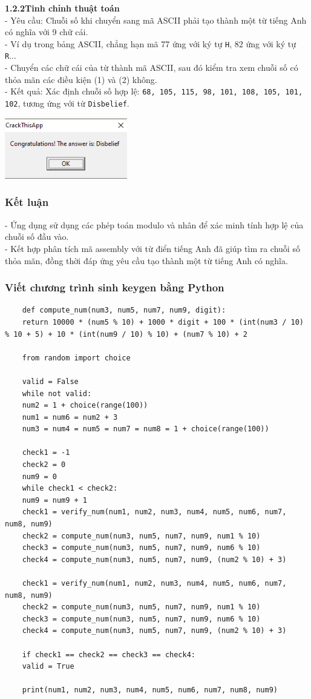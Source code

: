 \noindent\textbf{1.2.2\quad Tinh chỉnh thuật toán}\\
- Yêu cầu: Chuỗi số khi chuyển sang mã ASCII phải tạo thành một từ tiếng Anh có nghĩa với 9 chữ cái.\\
- Ví dụ trong bảng ASCII, chẳng hạn mã 77 ứng với ký tự \texttt{H}, 82 ứng với ký tự \texttt{R}...\\
- Chuyển các chữ cái của từ thành mã ASCII, sau đó kiểm tra xem chuỗi số có thỏa mãn các điều kiện (1) và (2) không.\\
- Kết quả: Xác định chuỗi số hợp lệ: \texttt{68, 105, 115, 98, 101, 108, 105, 101, 102}, tương ứng với từ \texttt{Disbelief}.
\begin{center}
	\includegraphics[width=0.4\textwidth]{img/file-1/image9.png}
\end{center}

\subsubsection{Kết luận}
- Ứng dụng sử dụng các phép toán modulo và nhân để xác minh tính hợp lệ của chuỗi số đầu vào.\\
- Kết hợp phân tích mã assembly với từ điển tiếng Anh đã giúp tìm ra chuỗi số thỏa mãn, đồng thời đáp ứng yêu cầu tạo thành một từ tiếng Anh có nghĩa.

\subsubsection{Viết chương trình sinh keygen bằng Python}
\begin{lstlisting}
	def compute_num(num3, num5, num7, num9, digit):
	return 10000 * (num5 % 10) + 1000 * digit + 100 * (int(num3 / 10) % 10 + 5) + 10 * (int(num9 / 10) % 10) + (num7 % 10) + 2
	
	from random import choice
	
	valid = False
	while not valid:
	num2 = 1 + choice(range(100))
	num1 = num6 = num2 + 3
	num3 = num4 = num5 = num7 = num8 = 1 + choice(range(100))
	
	check1 = -1
	check2 = 0
	num9 = 0
	while check1 < check2:
	num9 = num9 + 1
	check1 = verify_num(num1, num2, num3, num4, num5, num6, num7, num8, num9)
	check2 = compute_num(num3, num5, num7, num9, num1 % 10)
	check3 = compute_num(num3, num5, num7, num9, num6 % 10)
	check4 = compute_num(num3, num5, num7, num9, (num2 % 10) + 3)
	
	check1 = verify_num(num1, num2, num3, num4, num5, num6, num7, num8, num9)
	check2 = compute_num(num3, num5, num7, num9, num1 % 10)
	check3 = compute_num(num3, num5, num7, num9, num6 % 10)
	check4 = compute_num(num3, num5, num7, num9, (num2 % 10) + 3)
	
	if check1 == check2 == check3 == check4:
	valid = True
	
	print(num1, num2, num3, num4, num5, num6, num7, num8, num9)
\end{lstlisting} 
	

